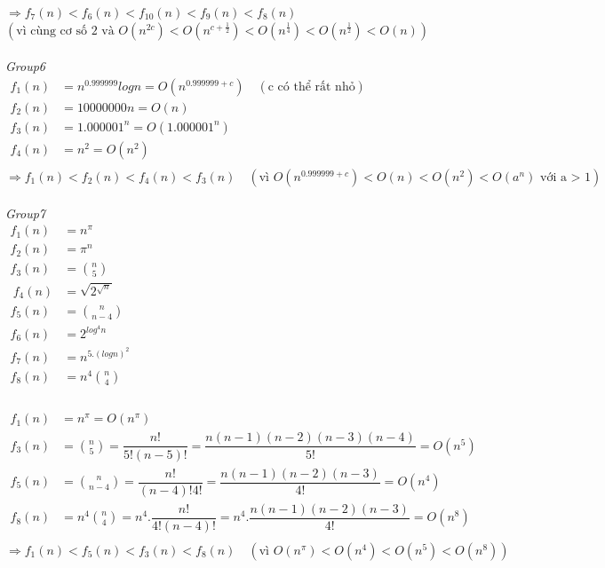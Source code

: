 \documentclass[12pt, letterpaper]{article}
\begin{document}
$\Rightarrow f_7(n) < f_6(n) < f_{10}(n) < f_9(n) < f_8(n)$ \\
$(\text{vì cùng cơ số 2 và } O(n^{2c}) < O(n^{c + \frac{1}{2}}) < O(n^{\frac{1}{4}}) < O(n^{\frac{1}{2}}) < O(n))$\\ \\
\textit{Group6}\\
$\begin{aligned}
    f_1(n) &= n^{0.999999}logn = O(n^{0.999999 + c}) \quad (\text{c có thể rất nhỏ}) \\
    f_2(n) &= 10000000n = O(n) \\
    f_3(n) &= 1.000001^n = O(1.000001^n) \\
    f_4(n) &= n^2 = O(n^2) \\
\end{aligned}$ \\
$\Rightarrow f_1(n) < f_2(n) < f_4(n) < f_3(n) \quad (\text{vì } O(n^{0.999999 + c}) < O(n) < O(n^2) < O(a^n) \text{ với a > 1})$\\ \\
\textit{Group7}\\
$\begin{aligned}
    f_1(n) &= n^{\pi} \\
    f_2(n) &= \pi^n \\
    f_3(n) &= \binom{n}{5} \\\
    f_4(n) &= \sqrt{2^{\sqrt{n}}} \\
    f_5(n) &= \binom{n}{n-4} \\
    f_6(n) &= 2^{log^4n} \\
    f_7(n) &= n^{5.(logn)^2} \\
    f_8(n) &= n^4 \binom{n}{4} \\
\end{aligned}$ \\
 \\
$\begin{aligned}
    f_1(n) &= n^{\pi} = O(n^{\pi}) \\
    f_3(n) &= \binom{n}{5} = \dfrac{n!}{5!(n-5)!} = \dfrac{n(n-1)(n-2)(n-3)(n-4)}{5!} = O(n^5) \\
    f_5(n) &= \binom{n}{n-4} = \dfrac{n!}{(n-4)!4!} = \dfrac{n(n-1)(n-2)(n-3)}{4!} = O(n^4) \\
    f_8(n) &= n^4 \binom{n}{4} = n^4.\dfrac{n!}{4!(n-4)!} = n^4.\dfrac{n(n-1)(n-2)(n-3)}{4!} = O(n^8) \\
\end{aligned}$ \\
$\Rightarrow f_1(n) < f_5(n) < f_3(n) < f_8(n) \quad (\text{vì } O(n^{\pi}) < O(n^4) < O(n^5) < O(n^8))$\\ \\
\end{document}
